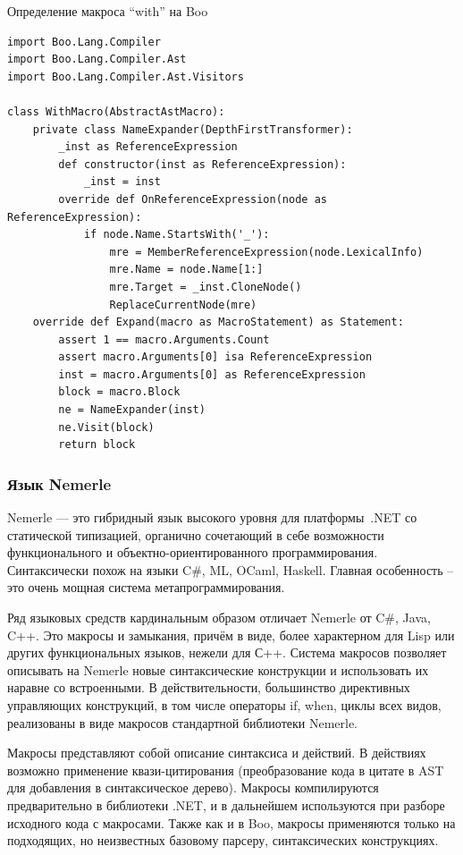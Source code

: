 \documentclass[a4paper,12pt]{article}
\begin{document}
\begin{example}
Определение макроса ``with'' на Boo
\end{example}
\begin{verbatim}
import Boo.Lang.Compiler
import Boo.Lang.Compiler.Ast
import Boo.Lang.Compiler.Ast.Visitors

class WithMacro(AbstractAstMacro):
    private class NameExpander(DepthFirstTransformer):
        _inst as ReferenceExpression
        def constructor(inst as ReferenceExpression):
            _inst = inst
        override def OnReferenceExpression(node as ReferenceExpression):
            if node.Name.StartsWith('_'):
                mre = MemberReferenceExpression(node.LexicalInfo)
                mre.Name = node.Name[1:]
                mre.Target = _inst.CloneNode()
                ReplaceCurrentNode(mre)
    override def Expand(macro as MacroStatement) as Statement:
        assert 1 == macro.Arguments.Count
        assert macro.Arguments[0] isa ReferenceExpression
        inst = macro.Arguments[0] as ReferenceExpression
        block = macro.Block
        ne = NameExpander(inst)
        ne.Visit(block)
        return block
\end{verbatim}

\subsubsection*{Язык Nemerle}
Nemerle — это гибридный язык высокого уровня для платформы~.NET со статической
типизацией, органично сочетающий в себе возможности функционального и
объектно-ориентированного программирования. Синтаксически похож на языки C\#,
ML, OCaml, Haskell. Главная особенность -- это очень мощная система
метапрограммирования.

Ряд языковых средств кардинальным образом отличает Nemerle от C\#, Java, C++.
Это макросы и замыкания, причём в виде, более характерном для Lisp или других
функциональных языков, нежели для С++. Система макросов позволяет описывать на
Nemerle новые синтаксические конструкции и использовать их наравне со
встроенными. В действительности, большинство директивных управляющих
конструкций, в том числе операторы if, when, циклы всех видов, реализованы в
виде макросов стандартной библиотеки Nemerle.

Макросы представляют собой описание синтаксиса и действий. В действиях
возможно применение квази-цитирования (преобразование кода в цитате в AST для
добавления в синтаксическое дерево). Макросы компилируются предварительно в
библиотеки .NET, и в дальнейшем используются при разборе исходного кода с
макросами. Также как и в Boo, макросы применяются только на подходящих, но
неизвестных базовому парсеру, синтаксических конструкциях.
\end{document}
